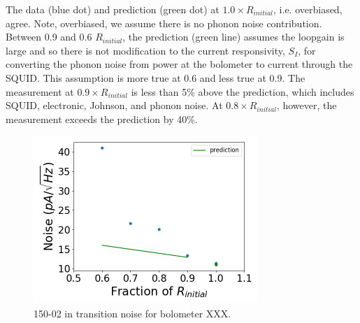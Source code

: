 The data (blue dot) and prediction (green dot) at $1.0 \times R_{initial}$, i.e. overbiased, agree. 
Note, overbiased, we assume there is no phonon noise contribution. 
Between 0.9 and 0.6 $R_{initial}$, the prediction (green line) assumes the loopgain is large and so there is not modification to the current responsivity, $S_{I}$, for converting the phonon noise from power at the bolometer to current through the \ac{SQUID}.
This assumption is more true at 0.6 and less true at 0.9. 
The measurement at $0.9 \times R_{initial}$ is less than 5\% above the prediction, which includes \ac{SQUID}, electronic, Johnson, and phonon noise. 
At $0.8 \times R_{initial}$, however, the measurement exceeds the prediction by 40\%. 


\begin{figure}[ht!]
\begin{center}
\includegraphics[height=2.5in]{figures/150-02_b53w0c0_it_noise.png}
\caption{150-02 in transition noise for bolometer XXX. 
\label{fig:150-02_it_noise} }
\end{center}
\end{figure}





